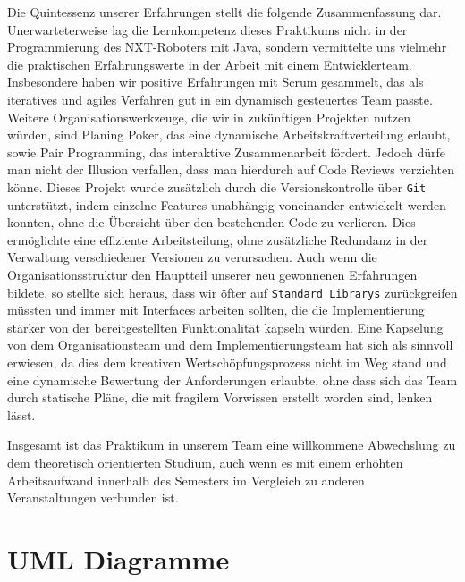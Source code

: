 \documentclass[oneside,abstractoff,a4paper]{scrartcl}
\begin{document}
Die Quintessenz unserer Erfahrungen stellt die folgende Zusammenfassung dar.  Unerwarteterweise lag die Lernkompetenz dieses Praktikums nicht in der Programmierung des NXT-Roboters mit Java, sondern vermittelte uns vielmehr die praktischen Erfahrungswerte in der Arbeit mit einem Entwicklerteam. Insbesondere haben wir positive Erfahrungen mit Scrum gesammelt, das als iteratives und agiles Verfahren gut in ein dynamisch gesteuertes Team passte.  Weitere Organisationswerkzeuge, die wir in zukünftigen Projekten nutzen würden, sind Planing Poker, das eine dynamische Arbeitskraftverteilung erlaubt, sowie Pair Programming, das interaktive Zusammenarbeit fördert. Jedoch dürfe man nicht der Illusion verfallen, dass man hierdurch auf Code Reviews verzichten könne. Dieses Projekt wurde zusätzlich durch die Versionskontrolle über \texttt{Git} unterstützt, indem einzelne Features unabhängig voneinander entwickelt werden konnten, ohne die Übersicht über den bestehenden Code zu verlieren. Dies ermöglichte eine effiziente Arbeitsteilung, ohne zusätzliche Redundanz in der Verwaltung verschiedener Versionen zu verursachen. 
Auch wenn die Organisationsstruktur den Hauptteil unserer neu gewonnenen Erfahrungen bildete, so stellte sich heraus, dass wir öfter auf \texttt{Standard Librarys} zurückgreifen müssten und immer mit Interfaces arbeiten sollten, die die Implementierung stärker von der bereitgestellten Funktionalität kapseln würden. Eine Kapselung von dem Organisationsteam und dem Implementierungsteam hat sich als sinnvoll erwiesen, da dies dem kreativen Wertschöpfungsprozess nicht im Weg stand und eine dynamische Bewertung der Anforderungen erlaubte, ohne dass sich das Team durch statische Pläne, die mit fragilem Vorwissen erstellt worden sind, lenken lässt.

Insgesamt ist das Praktikum in unserem Team eine willkommene Abwechslung zu dem theoretisch orientierten Studium, auch wenn es mit einem erhöhten Arbeitsaufwand innerhalb des Semesters im Vergleich zu anderen Veranstaltungen verbunden ist.



\appendix

\section{UML Diagramme}
\end{document}
